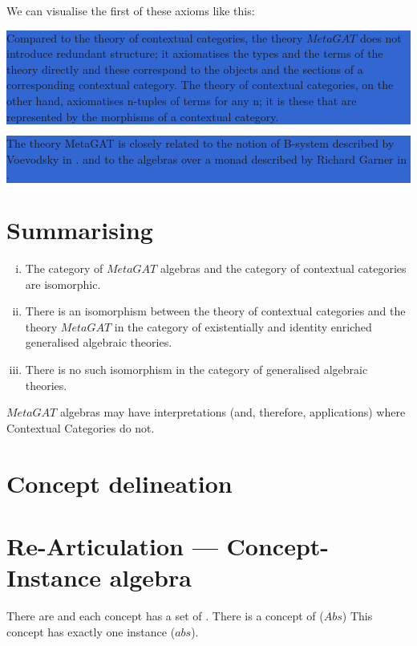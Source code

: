 \documentclass[10pt,a4paper]{article}
\newcommand{\highlightpara}[1]{\colorbox{highlight}{%
    \parbox{\dimexpr\linewidth-2\fboxsep}%
        {#1}}
}
\begin{document}
We can visualise the first of these axioms like this: 



\noindent
\highlightpara{
Compared to the theory of contextual categories, the theory $MetaGAT$ does not introduce redundant structure; it axiomatises the types and the terms of the theory directly and these correspond to the objects and the sections of a corresponding contextual category. The theory of contextual categories, on the other hand, axiomatises n-tuples of terms for any n; it is  these that are represented by the morphisms of a contextual category.}  

\noindent
\highlightpara{
The theory MetaGAT is closely related to the notion of B-system described by Voevodsky in
\cite{Voevodsky14B}.
and to the algebras over a monad described by Richard Garner in \cite{Garner15}.  
}
\section{Summarising}

\begin{enumerate}[(i)]
\item The category of $MetaGAT$ algebras and the category of contextual categories are isomorphic. 
\item There is an isomorphism between the theory of contextual categories and the theory $MetaGAT$ in the category of existentially and identity enriched generalised algebraic theories. 
\item There is no such isomorphism in the category of generalised algebraic theories.
\end{enumerate}

\noindent $MetaGAT$ algebras may have interpretations (and, therefore, applications) where Contextual Categories do not.

\section{Concept delineation}

\section{Re-Articulation ---  Concept-Instance algebra}

\mynote
There are  and each concept has a set of . There is a concept of ($Abs$)
 This concept has exactly one instance ($abs$). 
\end{document}
